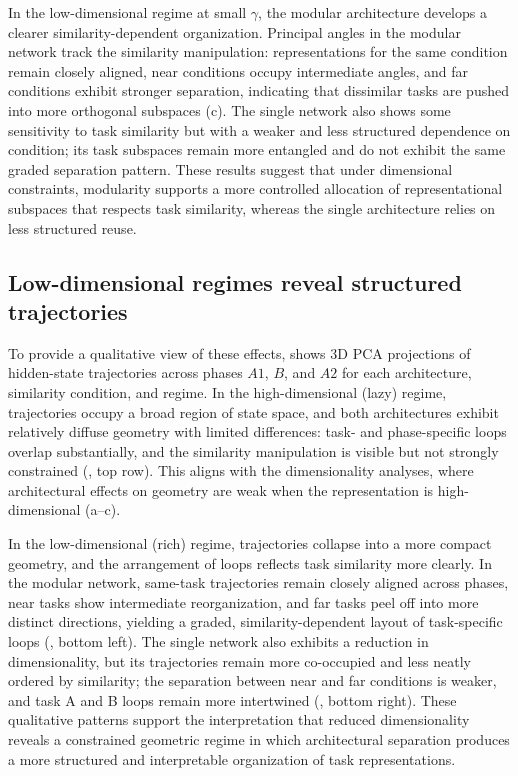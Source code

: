 \documentclass{article}
\theoremstyle{plain}
\theoremstyle{definition}
\theoremstyle{remark}
\begin{document}
In the low-dimensional regime at small $\gamma$, the modular architecture develops a clearer similarity-dependent organization. Principal angles in the modular network track the similarity manipulation: representations for the same condition remain closely aligned, near conditions occupy intermediate angles, and far conditions exhibit stronger separation, indicating that dissimilar tasks are pushed into more orthogonal subspaces (c). The single network also shows some sensitivity to task similarity but with a weaker and less structured dependence on condition; its task subspaces remain more entangled and do not exhibit the same graded separation pattern. These results suggest that under dimensional constraints, modularity supports a more controlled allocation of representational subspaces that respects task similarity, whereas the single architecture relies on less structured reuse.

\subsection{Low-dimensional regimes reveal structured trajectories}

To provide a qualitative view of these effects,  shows 3D PCA projections of hidden-state trajectories across phases $A1$, $B$, and $A2$ for each architecture, similarity condition, and regime. In the high-dimensional (lazy) regime, trajectories occupy a broad region of state space, and both architectures exhibit relatively diffuse geometry with limited differences: task- and phase-specific loops overlap substantially, and the similarity manipulation is visible but not strongly constrained (, top row). This aligns with the dimensionality analyses, where architectural effects on geometry are weak when the representation is high-dimensional (a–c).

In the low-dimensional (rich) regime, trajectories collapse into a more compact geometry, and the arrangement of loops reflects task similarity more clearly. In the modular network, same-task trajectories remain closely aligned across phases, near tasks show intermediate reorganization, and far tasks peel off into more distinct directions, yielding a graded, similarity-dependent layout of task-specific loops (, bottom left). The single network also exhibits a reduction in dimensionality, but its trajectories remain more co-occupied and less neatly ordered by similarity; the separation between near and far conditions is weaker, and task A and B loops remain more intertwined (, bottom right). These qualitative patterns support the interpretation that reduced dimensionality reveals a constrained geometric regime in which architectural separation produces a more structured and interpretable organization of task representations.
\end{document}
